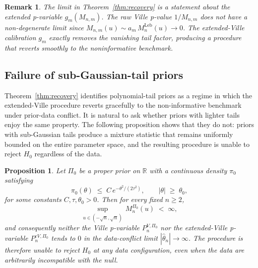 \documentclass{article}%
\newtheorem{proposition}[theorem]{Proposition}
\newtheorem{remark}[theorem]{Remark}
\newcommand{\Leb}{\mathrm{Leb}}
\begin{document}
\begin{remark}
The limit in Theorem~\ref{thm:recovery} is a statement about the
\emph{extended} p-variable \(g_m(M_{n,m})\). The raw Ville p-value
\(1/M_{n,m}\) does \emph{not} have a non-degenerate limit since
\(M_{n,m}(u)\sim a_m\,M_n^{\Leb}(u)\to 0\). The extended-Ville
calibration \(g_m\) exactly removes the vanishing tail factor,
producing a procedure that reverts smoothly to the noninformative
benchmark.
\end{remark}


\subsection{Failure of sub-Gaussian-tail priors}\label{sec:subGaussian}

Theorem~\ref{thm:recovery} identifies polynomial-tail priors
as a regime in which the extended-Ville procedure reverts gracefully
to the non-informative benchmark under prior-data conflict. It is
natural to ask whether priors with lighter tails enjoy the same
property. The following proposition shows that they do not: priors
with sub-Gaussian tails produce a mixture statistic that remains uniformly bounded on the entire parameter space, and the
resulting procedure is unable to reject \(H_0\) regardless of the
data.

\begin{proposition}\label{prop:subGaussian-bdd}
Let \(\Pi_0\) be a proper prior on \(\mathbb{R}\) with a continuous density \(\pi_0\) satisfying
\[
  \pi_0(\theta)\;\leq\; C\,e^{-\theta^2/(2\tau^2)},
  \qquad |\theta|\;\geq\; \theta_0,
\]
for some constants \(C,\tau,\theta_0>0\). Then for every fixed \(n\geq
2\),
\[
  \sup_{u\in(-\sqrt n,\sqrt n)}\,M_n^{\Pi_0}(u)\;<\;\infty,
\]
and consequently neither the Ville p-variable \(P_n^{V,\Pi_0}\) nor the
extended-Ville p-variable \(P_n^{eV,\Pi_0}\) tends to \(0\) in the
data-conflict limit \(|\widehat\theta_n|\to\infty\). The procedure is
therefore unable to reject \(H_0\) at any data configuration, even
when the data are arbitrarily incompatible with the null.
\end{proposition}
\end{document}
